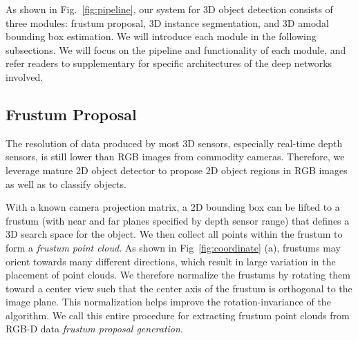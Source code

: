 As shown in Fig.~\ref{fig:pipeline}, our system for 3D object detection consists of three modules: frustum proposal, 3D instance segmentation, and 3D amodal bounding box estimation. We will introduce each module in the following subsections. We will focus on the pipeline and functionality of each module, and refer readers to supplementary for specific architectures of the deep networks involved.


\subsection{Frustum Proposal}
\label{sec:frustum_proposal}

The resolution of data produced by most 3D sensors, especially real-time depth sensors, is still lower than RGB images from commodity cameras. Therefore, we leverage mature 2D object detector to propose 2D object regions in RGB images as well as to classify objects.

With a known camera projection matrix, a 2D bounding box can be lifted to a frustum (with near and far planes specified by depth sensor range) that defines a 3D search space for the object. We then collect all points within the frustum to form a \emph{frustum point cloud}. As shown in Fig~\ref{fig:coordinate} (a), frustums may orient towards many different directions, which result in large variation in the placement of point clouds.  We therefore normalize the frustums by rotating them toward a center view such that the center axis of the frustum is orthogonal to the image plane. This normalization helps improve the rotation-invariance of the algorithm. %
We call this entire procedure for extracting frustum point clouds from RGB-D data \emph{frustum proposal generation}.


